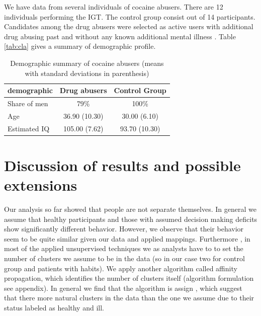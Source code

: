 \documentclass[12pt,a4paper,bibliography=totocnumbered,listof=totocnumbered]{scrartcl}
\begin{document}
We have data from several individuals of cocaine abusers. There are 12 individuals performing the IGT. The control group consist out of 14 participants. Candidates among the drug abusers were selected as active users with additional drug abusing past and without any known additional mental illness \cite{stout2004}. Table \ref{tab:cla} gives a summary of demographic profile.

\setlength{\tabcolsep}{12pt}
\renewcommand{\arraystretch}{1}
\begin{table}[!htbp]
	\centering 
	\begin{tabular}{lcc}
		\toprule
		\textbf{demographic} & \textbf{Drug abusers} & \textbf{Control Group} \\
		\hline
		Share of men &  79\% & 100\%\\
		Age & 36.90 (10.30) & 30.00 (6.10) \\
		Estimated IQ & 105.00 (7.62) & 93.70 (10.30) \\
		\bottomrule
	\end{tabular}
	\caption{Demographic summary of cocaine abusers (means with standard deviations in parenthesis)}
	\label{tab:cocs}
\end{table}

\section{Discussion of results and possible extensions }

Our analysis so far showed that people are not separate themselves. In general we assume that healthy participants and those with assumed decision making deficits show significantly different behavior. However, we observe that their behavior seem to be quite similar given our data and applied mappings. Furthermore , in most of the applied unsupervised techniques we as analysts have to to set the number of clusters we assume to be in the data (so in our case two for control group and patients with habits). We apply another algorithm called affinity propagation, which identifies the number of clusters itself (algorithm formulation see appendix). In general we find that the algorithm is assign , which suggest that there more natural clusters in the data than the  one we assume due to their status labeled as healthy and ill.

\end{document}
